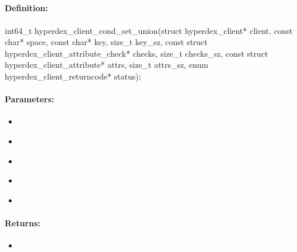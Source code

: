 \pagebreak
\subsection{}
\label{api:c:cond_set_union}


\paragraph{Definition:}
\begin{ccode}
int64_t hyperdex_client_cond_set_union(struct hyperdex_client* client,
        const char* space,
        const char* key, size_t key_sz,
        const struct hyperdex_client_attribute_check* checks, size_t checks_sz,
        const struct hyperdex_client_attribute* attrs, size_t attrs_sz,
        enum hyperdex_client_returncode* status);
\end{ccode}

\paragraph{Parameters:}
\begin{itemize}[noitemsep]
\item {}\\

\item {}\\

\item {}\\

\item {}\\

\item {}\\

\end{itemize}

\paragraph{Returns:}
\begin{itemize}[noitemsep]
\item {}\\

\end{itemize}

